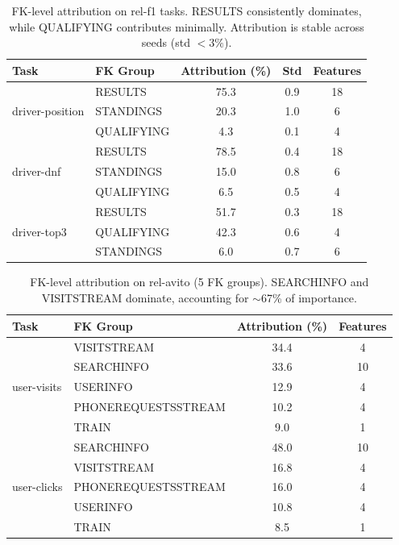 \documentclass{article}
\begin{document}
\begin{table}[t]
\centering
\caption{FK-level attribution on rel-f1 tasks. RESULTS consistently dominates, while
QUALIFYING contributes minimally. Attribution is stable across seeds (std $< 3\%$).}
\label{tab:attribution}
\begin{tabular}{llccc}
\toprule
Task & FK Group & Attribution (\%) & Std & Features \\
\midrule
\multirow{3}{*}{driver-position}
& RESULTS & 75.3 & 0.9 & 18 \\
& STANDINGS & 20.3 & 1.0 & 6 \\
& QUALIFYING & 4.3 & 0.1 & 4 \\
\midrule
\multirow{3}{*}{driver-dnf}
& RESULTS & 78.5 & 0.4 & 18 \\
& STANDINGS & 15.0 & 0.8 & 6 \\
& QUALIFYING & 6.5 & 0.5 & 4 \\
\midrule
\multirow{3}{*}{driver-top3}
& RESULTS & 51.7 & 0.3 & 18 \\
& QUALIFYING & 42.3 & 0.6 & 4 \\
& STANDINGS & 6.0 & 0.7 & 6 \\
\bottomrule
\end{tabular}
\end{table}

\begin{table}[t]
\centering
\caption{FK-level attribution on rel-avito (5 FK groups). SEARCHINFO and VISITSTREAM
dominate, accounting for $\sim$67\% of importance.}
\label{tab:attribution_avito}
\begin{tabular}{llcc}
\toprule
Task & FK Group & Attribution (\%) & Features \\
\midrule
\multirow{5}{*}{user-visits}
& VISITSTREAM & 34.4 & 4 \\
& SEARCHINFO & 33.6 & 10 \\
& USERINFO & 12.9 & 4 \\
& PHONEREQUESTSSTREAM & 10.2 & 4 \\
& TRAIN & 9.0 & 1 \\
\midrule
\multirow{5}{*}{user-clicks}
& SEARCHINFO & 48.0 & 10 \\
& VISITSTREAM & 16.8 & 4 \\
& PHONEREQUESTSSTREAM & 16.0 & 4 \\
& USERINFO & 10.8 & 4 \\
& TRAIN & 8.5 & 1 \\
\bottomrule
\end{tabular}
\end{table}
\end{document}

